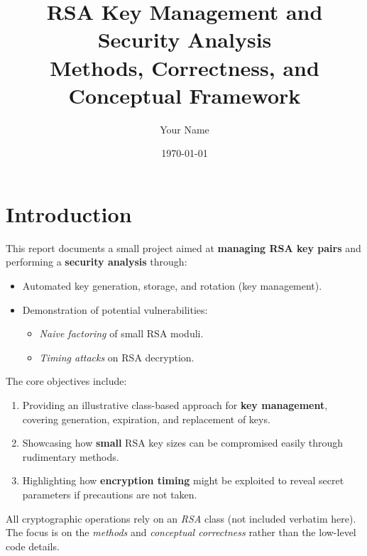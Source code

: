 \documentclass[12pt]{article}
\title{RSA Key Management and Security Analysis \\
       \large Methods, Correctness, and Conceptual Framework}
\author{Your Name}
\date{\today}
\begin{document}
\maketitle

\tableofcontents
\clearpage

\section{Introduction}
This report documents a small project aimed at \textbf{managing RSA key pairs} and performing a \textbf{security analysis} through:
\begin{itemize}
    \item Automated key generation, storage, and rotation (key management).
    \item Demonstration of potential vulnerabilities:
    \begin{itemize}
        \item \emph{Naive factoring} of small RSA moduli.
        \item \emph{Timing attacks} on RSA decryption.
    \end{itemize}
\end{itemize}

The core objectives include:
\begin{enumerate}
    \item Providing an illustrative class-based approach for \textbf{key management}, covering generation, expiration, and replacement of keys.
    \item Showcasing how \textbf{small} RSA key sizes can be compromised easily through rudimentary methods.
    \item Highlighting how \textbf{encryption timing} might be exploited to reveal secret parameters if precautions are not taken.
\end{enumerate}

\noindent
All cryptographic operations rely on an \textit{RSA} class (not included verbatim here). The focus is on the \emph{methods} and \emph{conceptual correctness} rather than the low-level code details.

\end{document}
